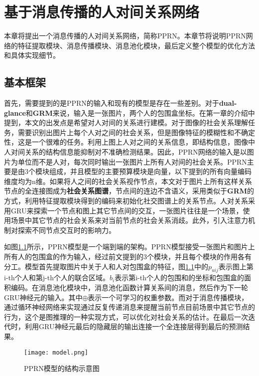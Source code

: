 
\chapter{基于消息传播的人对间关系网络}
\label{ch:model}

本章将提出一个消息传播的人对间关系网络，简称PPRN。本章节将说明PPRN网络的特征提取模块、消息传播模块、消息池化模块，最后定义整个模型的优化方法和具体实现细节。


\section{基本框架}
首先，需要提到的是PPRN的输入和现有的模型是存在一些差别。对于\textbf{dual-glance}和\textbf{GRM}来说，输入是一张图片，两个人的包围盒坐标。在第一章的介绍中提到，本文的出发点是希望对人对间的关系进行建模。对于图像的社会关系理解任务，需要识别出图片上每个人对之间的社会关系，但是图像特征的模糊性和不确定性，这是一个很难的任务。利用上图上人对之间的关系信息，即结构信息，图像中人对间关系的结构信息能抑制对不准确检测结果。因此，PPRN网络的输入是以图片为单位而不是人对，每次同时输出一张图片上所有人对间的社会关系。PPRN主要是由3个模块组成，并且模型的主要预算模块是向量，以下提到的所有向量编码维度均为n维。如果将人之间的社会关系视作节点，本文对于图片上所有这样关系节点的全连接图成为\textbf{社会关系图谱}，节点间的连边不含语义，采用类似于\textbf{GRM}的方式，利用特征提取模块得到的编码来初始化社交图谱上的关系节点。人对关系采用GRU来探索一个节点和图上其它节点间的交互，一张图片往往是一个场景，使用场景中其它节点的社会关系来对当前节点的社会关系消歧。此外，引入注意力机制对探索不同节点交互时的影响力。

如图\ref{fig:model-pprn}所示，PPRN模型是一个端到端的架构。PPRN模型接受一张图片和图片上所有人的包围盒的作为输入，经过前文提到的3个模块，并且每个模块的作用各有分工。模型首先提取图片中关于人和人对包围盒的特征，图\ref{fig:model-pprn}中的$p_{uij}$表示图上第i-th个人和第j-th个人的联合区域。$b_{i}$表示第i-th个人的包围和的坐标和包围盒的面积编码。在消息池化模块中，消息池化函数计算关系间的消息，然后作为下一轮GRU神经元的输入。其中$\oplus$表示一个可学习的权重参数。而对于消息传播模块，通过循环神经网络来实现通过反复传递消息来提醒当前节点目前场景中其它节点的行为，这个是图推理的一种实现方式，可以优化对社会关系的估计。在最后一次迭代时，利用GRU神经元最后的隐藏层的输出连接一个全连接层得到最后的预测结果。
\begin{figure}[htpb]
	\centering
	\texttt{[image: model.png]}
    \caption{PPRN模型的结构示意图}
	\vspace*{-3.5mm}
	\label{fig:model-pprn}
\end{figure}

